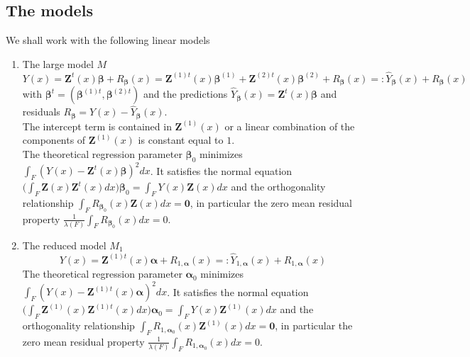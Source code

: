 \documentclass[a4paper,12pt,leqno, titlepage]{article}
\begin{document}
\subsection{The models}\label{models3phase}
 We shall work with the following linear models
 \begin{enumerate}
 \item
 The large model $M$
 \begin{equation}\label{largemodel}
 Y(x)=\pmb{Z}^t(x)\pmb{\beta}+ R_{\pmb{\beta}}(x)=\pmb{Z}^{(1)t}(x)\pmb{\beta}^{(1)}
 +\pmb{Z}^{(2)t}(x)\pmb{\beta}^{(2)}+ R_{\pmb{\beta}}(x)=:\hat{Y}_{\pmb{\beta}}(x)+R_{\pmb{\beta}}(x)
 \end{equation}
 \noindent with $\pmb{\beta}^t=({\pmb{\beta}^{(1)t}}, {\pmb{\beta}^{(2)t}})$ and the predictions
 $\hat{Y}_{\pmb{\beta}}(x)=\pmb{Z}^t(x)\pmb{\beta}$ and residuals $R_{\pmb{\beta}}=Y(x)-\hat{Y}_{\pmb{\beta}}(x)$.\\
 The intercept term is contained in $\pmb{Z}^{(1)}(x)$ or a linear combination of the components of $\pmb{Z}^{(1)}(x)$ is constant equal to $1$.\\
 The theoretical regression parameter $\pmb{\beta}_0$ minimizes
 $\int_F (Y(x)-\pmb{Z}^t(x)\pmb{\beta})^2dx$. It satisfies the normal equation
 $\big(\int_F\pmb{Z}(x)\pmb{Z}^t(x)dx\big)\pmb{\beta}_0=\int_F Y(x)\pmb{Z}(x)dx$ and the orthogonality relationship
 $\int_F R_{\pmb{\beta}_0}(x)\pmb{Z}(x)dx=\pmb{0}$, in particular the zero mean residual property
 $\frac{1}{\lambda(F)}\int_F R_{\pmb{\beta}_0}(x)dx=0$.
 \item
 The reduced model $M_1$
 \begin{equation}\label{reducedmodel}
 Y(x)=\pmb{Z}^{(1)t}(x)\pmb{\alpha} + R_{1,\pmb{\alpha}}(x)=:\hat{Y}_{1,\pmb{\alpha}}(x)+ R_{1,\pmb{\alpha}}(x)
 \end{equation}
 The theoretical regression parameter $\pmb{\alpha}_0$ minimizes
 $\int_F (Y(x)-\pmb{Z}^{(1)t}(x)\pmb{\alpha})^2dx$. It satisfies the normal equation
 $\big(\int_F \pmb{Z}^{(1)}(x)\pmb{Z}^{(1)t}(x)dx\big)\pmb{\alpha}_0=\int_FY(x)\pmb{Z}^{(1)}(x)dx$ and the orthogonality relationship
 $\int_F R_{1,\pmb{\alpha}_0}(x)\pmb{Z}^{(1)}(x)dx=\pmb{0}$, in particular the zero mean residual property $ \frac{1}{\lambda(F)}\int_F R_{1,\pmb{\alpha}_0}(x)dx=0$.
\end{enumerate}
\end{document}
